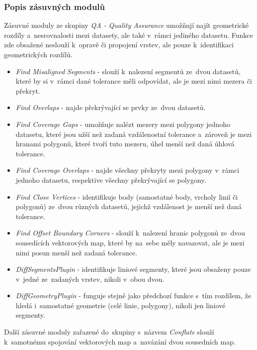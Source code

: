 \subsubsection{Popis zásuvných modulů}
\label{jcs-plugin}

Zásuvné moduly ze skupiny \textit{QA - Quality Assurance} umožňují najít
geometrické rozdíly a~nesrovnalosti mezi datasety, ale také v~rámci jediného
datasetu. Funkce zde obsažené neslouží k~opravě či propojení vrstev, ale 
pouze k~identifikaci geometrických rozdílů.

\begin{itemize}
 \item \textit{Find Misaligned Segments} - slouží k~nalezení segmentů 
    ze~dvou datasetů, které by si v~rámci dané tolerance měli odpovídat,
    ale je mezi nimi mezera či překryt. 
 \item \textit{Find Overlaps} - najde překrývající se prvky ze~dvou datasetů.
 \item \textit{Find Coverage Gaps} - umožňuje nalézt mezery mezi polygony
    jednoho datasetu, které jsou užší než zadaná vzdálenostní tolerance
    a~zároveň je mezi hranami polygonů, které tvoří tuto mezeru, úhel menší
    než daná úhlová tolerance.
 \item \textit{Find Coverage Overlaps} - najde všechny překryty mezi polygony
    v~rámci jednoho datasetu, respektive všechny překrývající se polygony.
 \item \textit{Find Close Vertices} - identifikuje body (samostatné body,
    vrcholy linií či polygonů) ze~dvou různých datasetů, jejichž vzdálenost
    je menší než daná tolerance.
 \item \textit{Find Offset Boundary Corners} - slouží k~nalezení hranic
    polygonů ze~dvou sou\-sedících vektorových map, které by na~sebe měly
    navazovat, ale je mezi nimi posun menší než zadaná tolerance.
 \item \textit{DiffSegmentsPlugin} - identifikuje liniové segmenty, které
    jsou obsaženy pouze v~jedné ze~zadaných vrstev, nikoli v~obou dvou.
 \item \textit{DiffGeometryPlugin} - funguje stejně jako předchozí funkce
    s~tím rozdílem, že hledá i~samostatné geometrie (celé linie, polygony),
    nikoli jen liniové segmenty.
\end{itemize}

Další zásuvné moduly zařazené do~skupiny s~názvem \textit{Conflate} slouží
k~samotnému spojování vektorových map a~navázání dvou sousedních map.

